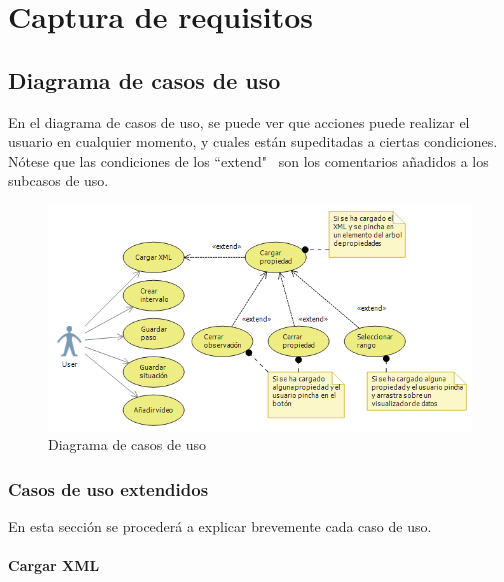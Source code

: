 \chapter{Captura de requisitos}
%

\section{Diagrama de casos de uso}
En el diagrama de casos de uso, se puede ver que acciones puede realizar el usuario en cualquier momento, y cuales
est\'an supeditadas a ciertas condiciones. N\'otese que las condiciones de los ``extend" \ son los comentarios a\~nadidos
a los subcasos de uso.

\begin{figure}[h]
\centering
\includegraphics[width=1.0\linewidth]{./Figures/useCaseDiagram.png}
\caption[Diagrama de casos de uso]{Diagrama de casos de uso}
\label{fig:useCaseDiagram}
\end{figure}

\subsection{Casos de uso extendidos}
En esta secci\'on se proceder\'a a explicar brevemente cada caso de uso. %

\subsubsection{Cargar XML}

